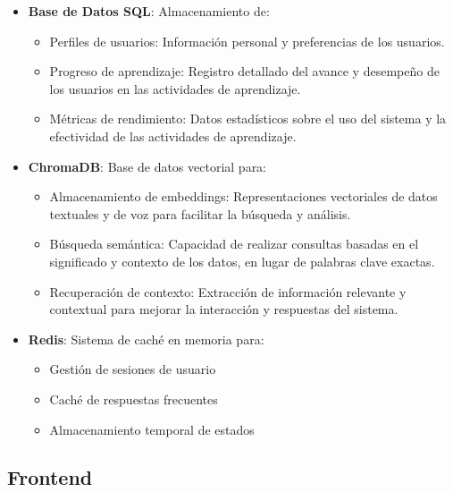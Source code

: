 \begin{itemize}
	\item \textbf{Base de Datos SQL}: Almacenamiento de:
		  \begin{itemize}
			  \item Perfiles de usuarios: Información personal y preferencias de los usuarios.
			  \item Progreso de aprendizaje: Registro detallado del avance y desempeño de los usuarios en las actividades de aprendizaje.
			  \item Métricas de rendimiento: Datos estadísticos sobre el uso del sistema y la efectividad de las actividades de aprendizaje.
		  \end{itemize}

	\item \textbf{ChromaDB}: Base de datos vectorial para:
		  \begin{itemize}
			  \item Almacenamiento de embeddings: Representaciones vectoriales de datos textuales y de voz para facilitar la búsqueda y análisis.
			  \item Búsqueda semántica: Capacidad de realizar consultas basadas en el significado y contexto de los datos, en lugar de palabras clave exactas.
		      \item Recuperación de contexto: Extracción de información relevante y contextual para mejorar la interacción y respuestas del sistema.
	      \end{itemize}

	\item \textbf{Redis}: Sistema de caché en memoria para:
	      \begin{itemize}
		      \item Gestión de sesiones de usuario
		      \item Caché de respuestas frecuentes
		      \item Almacenamiento temporal de estados
	      \end{itemize}
\end{itemize}

\subsection{Frontend}

